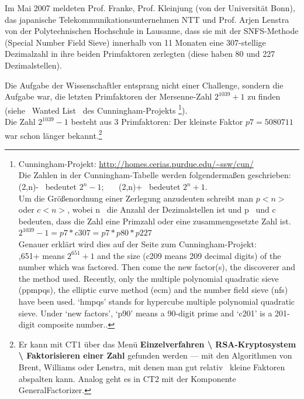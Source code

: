 \begin{refsegment}
Im Mai 2007 meldeten Prof. Franke, Prof. Kleinjung (von der Universität Bonn),
das japanische Telekommunikationsunternehmen NTT und Prof. Arjen Lenstra von
der Polytechnischen Hochschule in Lausanne, dass sie mit der SNFS-Methode
(Special Number Field Sieve) 
innerhalb von 11 Monaten eine $307$-stellige Dezimalzahl in ihre beiden
Primfaktoren zerlegten (diese haben 80 und 227 Dezimalstellen).

Die Aufgabe der Wissenschaftler entsprang nicht einer Challenge, sondern
die Aufgabe war, die letzten Primfaktoren der Mersenne-Zahl $2^{1039}+1$
zu finden (siehe~ \glqq Wanted List\grqq~ des Cunningham-Projekts%
\footnote{%
Cunningham-Projekt: \url{http://homes.cerias.purdue.edu/~ssw/cun/}\\
Die Zahlen in der Cunningham-Tabelle werden folgendermaßen geschrieben:\\
\glqq (2,n)-\grqq~ bedeutet $2^{n}-1$;~~~
\glqq (2,n)+\grqq~ bedeutet $2^{n}+1$.\\
Um die Größenordnung einer Zerlegung anzudeuten schreibt man $p<n>$ oder $c<n>$,
wobei \glqq n\grqq~ die Anzahl der Dezimalstellen ist und \glqq p\grqq~ und \glqq c\grqq~
bedeuten, dass die Zahl eine Primzahl oder eine zusammengesetzte Zahl ist.\\
$2^{1039}-1 = p7 * c307 = p7 * p80 * p227$\\
Genauer erklärt wird dies auf der Seite zum Cunningham-Projekt:\\
,651+ means $2^{651} + 1$ and the size (c209 means 209 decimal digits)
of the
number which was factored.  Then come the new factor(s), the discoverer and
the method used.  Recently, only the multiple polynomial quadratic sieve
(ppmpqs), the elliptic curve method (ecm) and the number field sieve (nfs)
have been used.  `hmpqs' stands for hypercube multiple polynomial quadratic
sieve.  Under `new factors', `p90' means a 90-digit prime and `c201' is a
201-digit composite number.\grqq.
}).\\


Die Zahl $2^{1039}-1$ besteht aus 3 Primfaktoren: Der kleinste Faktor
$p7 = 5080711$ war schon länger bekannt.\footnote{%
  Er kann mit CT1 über das Menü
  \textbf{Einzelverfahren \textbackslash{} RSA-Kryptosystem \textbackslash{}
  Faktorisieren einer Zahl} gefunden werden --- mit den Algorithmen von Brent,
  Williams oder Lenstra, mit denen man gut \glqq relativ\grqq~ kleine Faktoren
  abspalten kann. Analog geht es in CT2 mit der Komponente
  GeneralFactorizer.
}


\end{refsegment}
